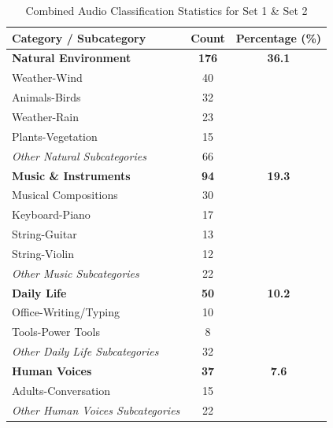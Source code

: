 \begin{table}[h!]
    \centering
    \caption{Combined Audio Classification Statistics for Set 1 \& Set 2}
    \label{tab:audio_stats_combined}
    \begin{tabularx}{\linewidth}{l S[table-format=3.0] S[table-format=2.1]}
        \toprule
        \textbf{Category / Subcategory} & \textbf{Count} & {\textbf{Percentage (\%)}} \\
        \midrule
        
        \textbf{Natural Environment} & \textbf{176} & \textbf{36.1} \\
        \quad Weather-Wind & 40 & {} \\
        \quad Animals-Birds & 32 & {} \\
        \quad Weather-Rain & 23 & {} \\
        \quad Plants-Vegetation & 15 & {} \\
        \quad \textit{Other Natural Subcategories} & 66 & {} \\
        
        \addlinespace
        
        \textbf{Music \& Instruments} & \textbf{94} & \textbf{19.3} \\
        \quad Musical Compositions & 30 & {} \\
        \quad Keyboard-Piano & 17 & {} \\
        \quad String-Guitar & 13 & {} \\
        \quad String-Violin & 12 & {} \\
        \quad \textit{Other Music Subcategories} & 22 & {} \\
        
        \addlinespace
        
        \textbf{Daily Life} & \textbf{50} & \textbf{10.2} \\
        \quad Office-Writing/Typing & 10 & {} \\
        \quad Tools-Power Tools & 8 & {} \\
        \quad \textit{Other Daily Life Subcategories} & 32 & {} \\
        
        \addlinespace
        
        \textbf{Human Voices} & \textbf{37} & \textbf{7.6} \\
        \quad Adults-Conversation & 15 & {} \\
        \quad \textit{Other Human Voices Subcategories} & 22 & {} \\
        

\end{tabularx}
\end{table}
